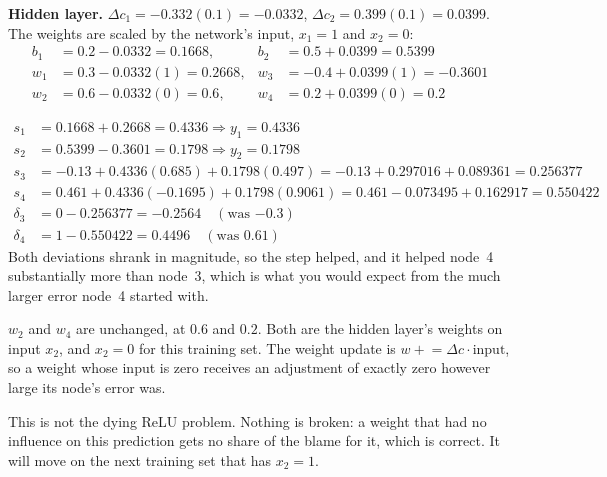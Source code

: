 \textbf{Hidden layer.} $\Delta c_1 = -0.332(0.1) = -0.0332$, $\Delta c_2 = 0.399(0.1) = 0.0399$.
The weights are scaled by the network's input, $x_1 = 1$ and $x_2 = 0$:
\begin{align*}
  b_1 &= 0.2 - 0.0332 = \mathbf{0.1668}, & b_2 &= 0.5 + 0.0399 = \mathbf{0.5399} \\
  w_1 &= 0.3 - 0.0332(1) = \mathbf{0.2668}, & w_3 &= -0.4 + 0.0399(1) = \mathbf{-0.3601} \\
  w_2 &= 0.6 - 0.0332(0) = \mathbf{0.6}, & w_4 &= 0.2 + 0.0399(0) = \mathbf{0.2}
\end{align*}

\begin{align*}
  s_1 &= 0.1668 + 0.2668 = 0.4336 \Rightarrow y_1 = 0.4336 \\
  s_2 &= 0.5399 - 0.3601 = 0.1798 \Rightarrow y_2 = 0.1798 \\
  s_3 &= -0.13 + 0.4336(0.685) + 0.1798(0.497) = -0.13 + 0.297016 + 0.089361
    = \mathbf{0.256377} \\
  s_4 &= 0.461 + 0.4336(-0.1695) + 0.1798(0.9061) = 0.461 - 0.073495 + 0.162917
    = \mathbf{0.550422} \\
  \delta_3 &= 0 - 0.256377 = \mathbf{-0.2564} \quad (\text{was } {-0.3}) \\
  \delta_4 &= 1 - 0.550422 = \mathbf{0.4496} \quad (\text{was } 0.61)
\end{align*}
Both deviations shrank in magnitude, so the step helped, and it helped node~4 substantially more
than node~3, which is what you would expect from the much larger error node~4 started with.

$w_2$ and $w_4$ are unchanged, at $0.6$ and $0.2$. Both are the hidden layer's weights on input
$x_2$, and $x_2 = 0$ for this training set. The weight update is
$w \mathrel{+}= \Delta c \cdot \text{input}$, so a weight whose input is zero receives an adjustment
of exactly zero however large its node's error was.

This is not the dying ReLU problem. Nothing is broken: a weight that had no influence on this
prediction gets no share of the blame for it, which is correct. It will move on the next training
set that has $x_2 = 1$. 


